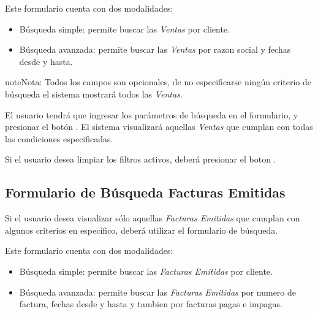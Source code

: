 \documentclass[a4paper,10pt,spanish]{sphinxmanual}
\begin{document}

Este formulario cuenta con dos modalidades:
\begin{itemize}
\item {} 
Búsqueda simple: permite buscar las \emph{Ventas} por cliente.

\item {} 
Búsqueda avanzada: permite buscar las \emph{Ventas} por razon social y fechas desde y hasta.

\end{itemize}

\begin{notice}{note}{Nota:}
Todos los campos son opcionales, de no especificarse ningún criterio de búsqueda el sistema mostrará todos las \emph{Ventas}.
\end{notice}

El usuario tendrá que ingresar los parámetros de búsqueda en el formulario, y presionar el botón . El sistema visualizará aquellas \emph{Ventas} que cumplan con todas las condiciones especificadas.

Si el usuario desea limpiar los filtros activos, deberá presionar el boton .



\subsection{Formulario de Búsqueda Facturas Emitidas}
\label{ventas:formulario-de-busqueda-facturas-emitidas}\label{ventas:formulario-busqueda-factemit}
Si el usuario desea visualizar sólo aquellas \emph{Facturas Emitidas} que cumplan con algunos criterios en específico, deberá utilizar el formulario de búsqueda.


Este formulario cuenta con dos modalidades:
\begin{itemize}
\item {} 
Búsqueda simple: permite buscar las \emph{Facturas Emitidas} por cliente.

\item {} 
Búsqueda avanzada: permite buscar las \emph{Facturas Emitidas} por numero de factura, fechas desde y hasta y tambien por facturas pagas e impagas.

\end{itemize}
\end{document}
